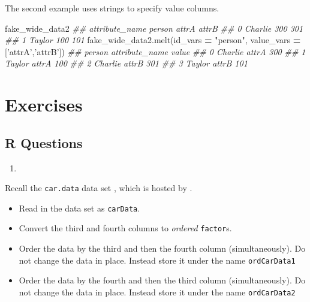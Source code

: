 \documentclass[12pt,krantz2]{krantz}
\makeatletter
\newenvironment{Shaded}{\begin{snugshade}}{\end{snugshade}}
\newcommand{\CommentTok}[1]{\textcolor[rgb]{0.37,0.37,0.37}{\textit{#1}}}
\newcommand{\NormalTok}[1]{#1}
\newcommand{\OperatorTok}[1]{\textcolor[rgb]{0.43,0.43,0.43}{\textbf{#1}}}
\newcommand{\StringTok}[1]{\textcolor[rgb]{0.5,0.5,0.5}{#1}}
\providecommand{\tightlist}{%
  \setlength{\itemsep}{0pt}\setlength{\parskip}{0pt}}
\newenvironment{kframe}{%
\medskip{}
\setlength{\fboxsep}{.8em}
 \def\at@end@of@kframe{}%
 \ifinner\ifhmode%
  \def\at@end@of@kframe{\end{minipage}}%
  \begin{minipage}{\columnwidth}%
 \fi\fi%
 \def\FrameCommand##1{\hskip\@totalleftmargin \hskip-\fboxsep
 \colorbox{shadecolor}{##1}\hskip-\fboxsep
     \hskip-\linewidth \hskip-\@totalleftmargin \hskip\columnwidth}%
 \MakeFramed {\advance\hsize-\width
   \@totalleftmargin\z@ \linewidth\hsize
   \@setminipage}}%
 {\par\unskip\endMakeFramed%
 \at@end@of@kframe}
\renewenvironment{Shaded}{\begin{kframe}}{\end{kframe}}
\makeatother
\begin{document}
The second example uses strings to specify value columns.

\begin{Shaded}
\begin{Highlighting}[]
\NormalTok{fake_wide_data2}
\CommentTok{## attribute_name   person  attrA  attrB}
\CommentTok{## 0               Charlie    300    301}
\CommentTok{## 1                Taylor    100    101}
\NormalTok{fake_wide_data2.melt(id_vars }\OperatorTok{=} \StringTok{"person"}\NormalTok{, }
\NormalTok{                     value_vars }\OperatorTok{=}\NormalTok{ [}\StringTok{'attrA'}\NormalTok{,}\StringTok{'attrB'}\NormalTok{])}
\CommentTok{##     person attribute_name  value}
\CommentTok{## 0  Charlie          attrA    300}
\CommentTok{## 1   Taylor          attrA    100}
\CommentTok{## 2  Charlie          attrB    301}
\CommentTok{## 3   Taylor          attrB    101}
\end{Highlighting}
\end{Shaded}

\hypertarget{exercises-10}{%
\section{Exercises}\label{exercises-10}}

\hypertarget{r-questions-9}{%
\subsection{R Questions}\label{r-questions-9}}

\begin{enumerate}
\def\labelenumi{\arabic{enumi}.}
\item
\end{enumerate}

Recall the \texttt{car.data} data set \citep{misc_car_evaluation_19}, which is hosted by \citep{uci_data}.

\begin{itemize}
\tightlist
\item
  Read in the data set as \texttt{carData}.
\item
  Convert the third and fourth columns to \emph{ordered} \texttt{factor}s.
\item
  Order the data by the third and then the fourth column (simultaneously). Do not change the data in place. Instead store it under the name \texttt{ordCarData1}
\item
  Order the data by the fourth and then the third column (simultaneously). Do not change the data in place. Instead store it under the name \texttt{ordCarData2}
\end{itemize}
\end{document}
